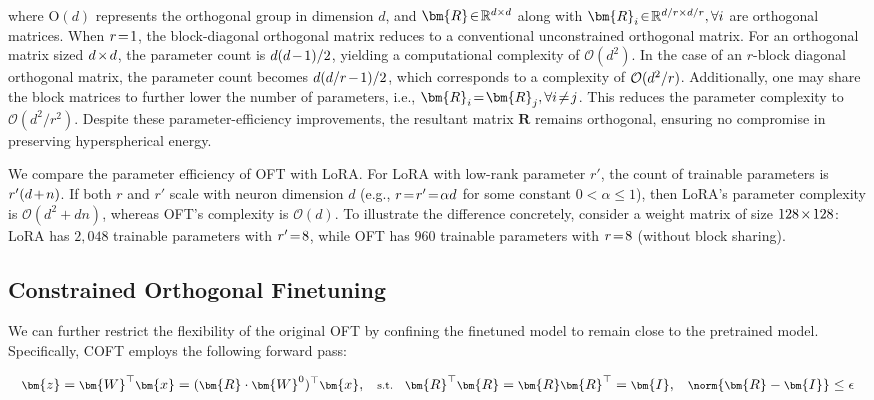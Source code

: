 where $\text{O}(d)$ represents the orthogonal group in dimension $d$, and $\thickmuskip=2mu \medmuskip=2mu \bm{R}\in\mathbb{R}^{d\times d}$ along with $\thickmuskip=2mu \medmuskip=2mu \bm{R}_i\in\mathbb{R}^{d/r\times d/r},\forall i$ are orthogonal matrices. When $\thickmuskip=2mu \medmuskip=2mu r=1$, the block-diagonal orthogonal matrix reduces to a conventional unconstrained orthogonal matrix. For an orthogonal matrix sized $\thickmuskip=2mu \medmuskip=2mu d\times d$, the parameter count is $\thickmuskip=2mu \medmuskip=2mu d(d-1)/2$, yielding a computational complexity of $\mathcal{O}(d^2)$. In the case of an $r$-block diagonal orthogonal matrix, the parameter count becomes $\thickmuskip=2mu \medmuskip=2mu d(d/r-1)/2$, which corresponds to a complexity of $\thickmuskip=2mu \medmuskip=2mu \mathcal{O}(d^2/r)$. Additionally, one may share the block matrices to further lower the number of parameters, i.e., $\thickmuskip=2mu \medmuskip=2mu \bm{R}_i=\bm{R}_j,\forall i\neq j$. This reduces the parameter complexity to $\mathcal{O}(d^2/r^2)$. Despite these parameter-efficiency improvements, the resultant matrix $\bm{R}$ remains orthogonal, ensuring no compromise in preserving hyperspherical energy.

We compare the parameter efficiency of OFT with LoRA. For LoRA with low-rank parameter $r'$, the count of trainable parameters is $\thickmuskip=2mu \medmuskip=2mu r'(d+n)$. If both $r$ and $r'$ scale with neuron dimension $d$ (e.g., $\thickmuskip=2mu \medmuskip=2mu r=r'=\alpha d$ for some constant $0<\alpha\leq 1$), then LoRA’s parameter complexity is $\mathcal{O}(d^2 + dn)$, whereas OFT’s complexity is $\mathcal{O}(d)$. To illustrate the difference concretely, consider a weight matrix of size $\thickmuskip=2mu \medmuskip=2mu 128 \times 128$: LoRA has $2,048$ trainable parameters with $\thickmuskip=2mu \medmuskip=2mu r'=8$, while OFT has $960$ trainable parameters with $\thickmuskip=2mu \medmuskip=2mu r=8$ (without block sharing).

\subsection{Constrained Orthogonal Finetuning}

We can further restrict the flexibility of the original OFT by confining the finetuned model to remain close to the pretrained model. Specifically, COFT employs the following forward pass:

\begin{equation}\label{eq:coft_general}
    \footnotesize
    \bm{z} = \bm{W}^\top \bm{x} = (\bm{R} \cdot \bm{W}^0)^\top \bm{x}, \quad \text{s.t.} \quad \bm{R}^\top \bm{R} = \bm{R} \bm{R}^\top = \bm{I}, \quad \norm{\bm{R} - \bm{I}} \leq \epsilon
\end{equation}

